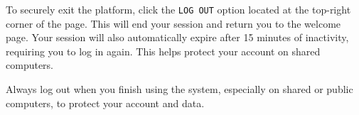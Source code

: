 

To securely exit the platform, click the \texttt{LOG OUT} option located at the top-right corner of the page. This will end your session and return you to the welcome page. Your session will also automatically expire after 15 minutes of inactivity, requiring you to log in again. This helps protect your account on shared computers.

\warning Always log out when you finish using the system, especially on shared or public computers, to protect your account and data.